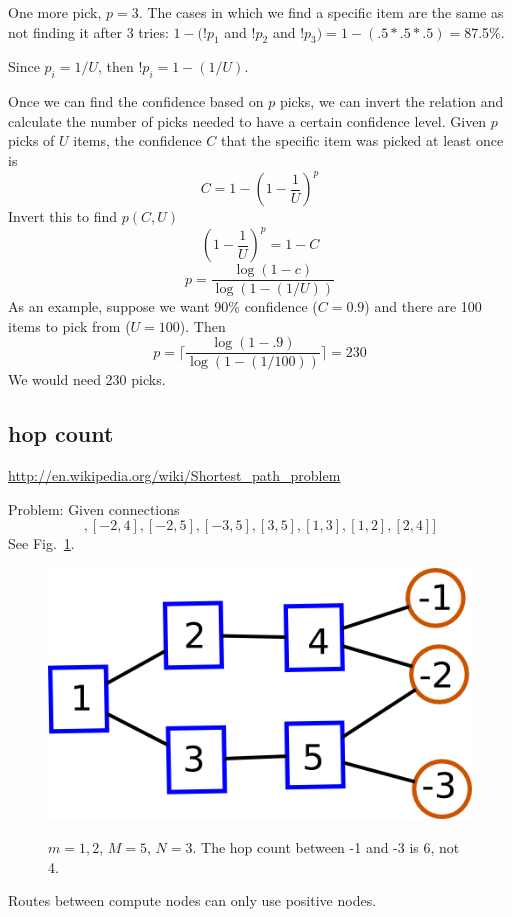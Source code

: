 \documentclass[pdftex]{article}
\begin{document}
One more pick, $p=3$. The cases in which we find a specific item are the same as not finding it after 3 tries: $1-(!p_1$ and $!p_2$ and $!p_3)=1-(.5*.5*.5)=$87.5\%. 

Since $p_i=1/U$, then $!p_i=1-(1/U)$.
 
Once we can find the confidence based on $p$ picks, we can invert the relation and calculate the number of picks needed to have a certain confidence level. Given $p$ picks of $U$ items, the confidence $C$ that the specific item was picked at least once is
\begin{equation}
 C = 1 - \left(1-\frac{1}{U}\right)^p
\end{equation}
Invert this to find $p(C,U)$
\begin{equation}
  \left(1-\frac{1}{U}\right)^p = 1-C
\end{equation}
\begin{equation}
 p = \frac{\log(1-c)}{\log(1-(1/U))}
\end{equation}
As an example, suppose we want 90\% confidence ($C=0.9$) and there are 100 items to pick from ($U=100$). Then
\begin{equation}
 p = \lceil\frac{\log(1-.9)}{\log(1-(1/100))}\rceil = 230
\end{equation}
We would need 230 picks.

\subsection{hop count}

\href{http://en.wikipedia.org/wiki/Shortest_path_problem}{http://en.wikipedia.org/wiki/Shortest\_path\_problem}

Problem: Given connections
\begin{equation}
 [[-1,4],[-2,4],[-2,5],[-3,5],[3,5],[1,3],[1,2],[2,4]]
\end{equation}
See Fig.~\ref{fig:wrong_hop_count}.
\begin{figure}
\begin{center}
\includegraphics[scale=.3]{pictures/N3_n2_M5_m2}
\label{fig:wrong_hop_count}
 \caption{$m=1,2$, $M=5$, $N=3$. The hop count between -1 and -3 is 6, not 4.}
\end{center}
\end{figure}
Routes between compute nodes can only use positive nodes.
\end{document}
